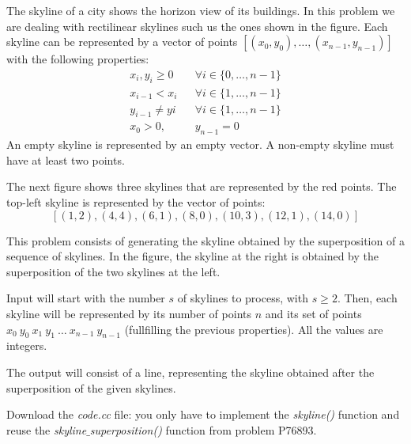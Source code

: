 
\Statement

The skyline of a city shows the horizon view of its buildings. In this problem we are dealing with rectilinear skylines such us the ones shown in the figure.
Each skyline can be represented by a vector of points $[(x_0,y_0),\ldots,(x_{n-1},y_{n-1})]$ with the following properties:
\begin{eqnarray*}
    x_i, y_i \geq 0 & & \forall i\in\{0,\ldots,n-1\}\\
    x_{i-1} < x_i & & \forall i\in\{1,\ldots,n-1\}\\
    y_{i-1} \neq y{i} & & \forall i\in\{1,\ldots,n-1\}\\
    x_0 > 0, & & y_{n-1} = 0
\end{eqnarray*}
An empty skyline is represented by an empty vector. A non-empty skyline must have at least two points.

\medskip

The next figure shows three skylines that are represented by the red points. The top-left skyline is represented by the vector of points:
\[ [(1,2), (4,4), (6,1), (8,0), (10,3), (12,1), (14,0)] \]


This problem consists of generating the skyline obtained by the superposition of
a sequence of skylines. In the figure, the skyline at the right is obtained by the superposition of the two skylines at the left.

\Input

Input will start with the number $s$ of skylines to process, with $s\ge 2$.
Then, each skyline will be represented by its number of points $n$ and
its set of points $x_0~y_0~x_1~y_1~\ldots~x_{n-1}~y_{n-1}$
(fullfilling the previous properties).
All the values are integers.


\Output

The output will consist of a line,
representing the skyline obtained after the superposition
of the given skylines.

\Observation

Download the \emph{code.cc} file: you only have to implement the
\emph{skyline()} function and reuse the
\emph{skyline$\_$superposition()} function from problem P76893.


\clearpage

\SampleTwoCol
